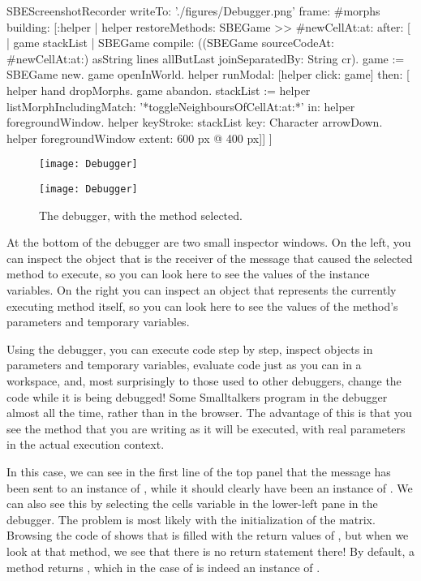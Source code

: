\documentclass[a4paper,10pt,twoside]{book}
\begin{document}
\begin{ExecuteSmalltalkScript}
SBEScreenshotRecorder writeTo: './figures/Debugger.png' frame: #morphs building: [:helper |
	helper restoreMethods: {SBEGame >> #newCellAt:at:} after: [
		| game stackList |
		SBEGame compile: ((SBEGame sourceCodeAt: #newCellAt:at:) asString
			lines allButLast joinSeparatedBy: String cr).
		game := SBEGame new.
		game openInWorld.
		helper
			runModal: [helper click: game]
			then: [
				helper hand dropMorphs.
				game abandon.
				stackList := helper listMorphIncludingMatch: '*toggleNeighboursOfCellAt:at:*' in: helper foregroundWindow.
				helper keyStroke: stackList key: Character arrowDown.
				helper foregroundWindow extent: 600 px @ 400 px]]
]
\end{ExecuteSmalltalkScript}
\begin{figure}[ht]
\ifluluelse
	{\centerline {\texttt{[image: Debugger]}}}
	{\centerline {\texttt{[image: Debugger]}}}
\caption{The debugger, with the method   selected.
\label{fig:debugToggle}}
\end{figure}

At the bottom of the debugger are two small inspector windows.
On the left, you can inspect the object that is the receiver of the message that caused the selected method to execute, so you can look here to see the values of the instance variables.
On the right you can inspect an object that represents the currently executing method itself, so you can look here to see the values of the method's parameters and temporary variables.

Using the debugger, you can execute code step by step, inspect objects in parameters and temporary variables, evaluate code just as you can in a workspace, and, most surprisingly to those used to other debuggers, change the code while it is being debugged!
Some Smalltalkers program in the debugger almost all the time, rather than in the browser.
The advantage of this is that you see the method that you are writing as it will be executed, with real parameters in the actual execution context.

In this case, we can see in the first line of the top panel that the  message has been sent to an instance of , while it should clearly have been an instance of .
We can also see this by selecting the cells variable in the lower-left pane in the debugger.
The problem is most likely with the initialization of the  matrix.
Browsing the code of  shows that  is filled with the return values of , but when we look at that method, we see that there is no return statement there!
By default, a method returns , which in the case of  is indeed an instance of .
\end{document}
